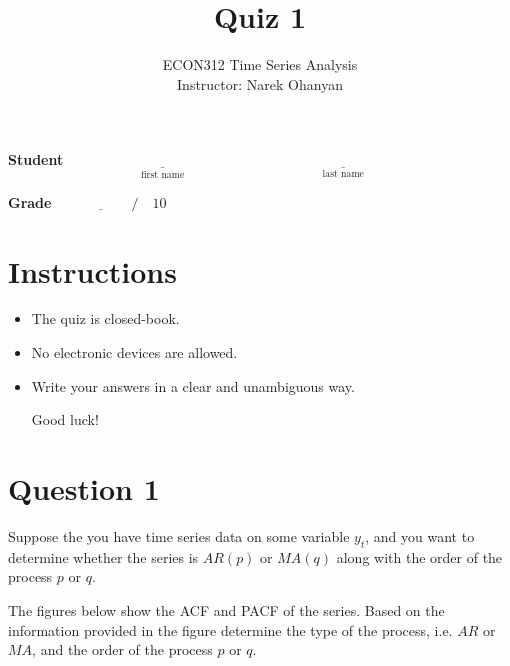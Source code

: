 \documentclass[12pt]{article}
\title{\textbf{Quiz 1}}
\author{ECON312 Time Series Analysis \\ Instructor: Narek Ohanyan}
\date{}
\begin{document}
\maketitle

\vspace{1cm}

\textbf{Student} $ \qquad \underset{\text{first name}}{\underline{\hspace{4cm}}} \quad \underset{\text{last name}}{\underline{\hspace{6cm}}}  $

\bigskip
\textbf{Grade} $ \qquad \underline{\hspace{1cm}} \quad / \quad 10 $


\vspace{1cm}

\section*{Instructions}

\begin{itemize}
    \item The quiz is closed-book.
    \item No electronic devices are allowed.
    \item Write your answers in a clear and unambiguous way.

          Good luck!
\end{itemize}


\newpage

\section*{Question 1 }

Suppose the you have time series data on some variable $ y_{t} $, and you want to determine whether the series is $ AR(p) $ or $ MA(q) $ along with the order of the process $ p $ or $ q $.

The figures below show the ACF and PACF of the series. Based on the information provided in the figure determine the type of the process, i.e. $ AR $ or $ MA $, and the order of the process $ p $ or $ q $.
\end{document}

